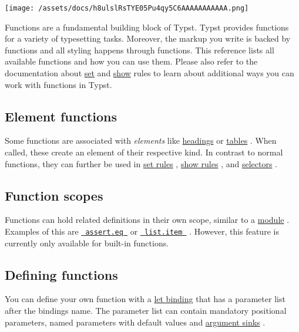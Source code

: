 \texttt{[image: /assets/docs/h8ulslRsTYE05Pu4qy5C6AAAAAAAAAAA.png]}

Functions are a fundamental building block of Typst. Typst provides
functions for a variety of typesetting tasks. Moreover, the markup you
write is backed by functions and all styling happens through functions.
This reference lists all available functions and how you can use them.
Please also refer to the documentation about
\href{/docs/reference/styling/\#set-rules}{set} and
\href{/docs/reference/styling/\#show-rules}{show} rules to learn about
additional ways you can work with functions in Typst.

\subsection{Element functions}\label{element-functions}

Some functions are associated with \emph{elements} like
\href{/docs/reference/model/heading/}{headings} or
\href{/docs/reference/model/table/}{tables} . When called, these create
an element of their respective kind. In contrast to normal functions,
they can further be used in
\href{/docs/reference/styling/\#set-rules}{set rules} ,
\href{/docs/reference/styling/\#show-rules}{show rules} , and
\href{/docs/reference/foundations/selector/}{selectors} .

\subsection{Function scopes}\label{function-scopes}

Functions can hold related definitions in their own scope, similar to a
\href{/docs/reference/scripting/\#modules}{module} . Examples of this
are
\href{/docs/reference/foundations/assert/\#definitions-eq}{\texttt{\ assert.eq\ }}
or
\href{/docs/reference/model/list/\#definitions-item}{\texttt{\ list.item\ }}
. However, this feature is currently only available for built-in
functions.

\subsection{Defining functions}\label{defining-functions}

You can define your own function with a
\href{/docs/reference/scripting/\#bindings}{let binding} that has a
parameter list after the binding\textquotesingle s name. The parameter
list can contain mandatory positional parameters, named parameters with
default values and
\href{/docs/reference/foundations/arguments/}{argument sinks} .


